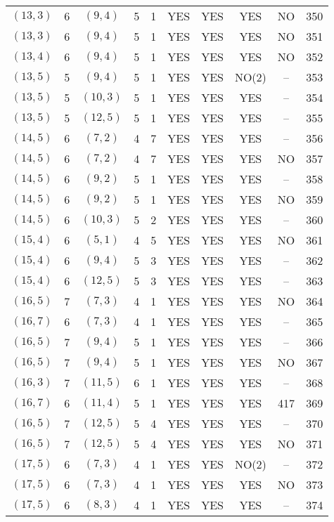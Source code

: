 \begin{longtable}{|c|c|c|c|c|c|c|c|c|c|}
$(13, 3)$ & 6 & $(9, 4)$ & 5 & 1 & YES & YES & YES & NO & 350\\
$(13, 3)$ & 6 & $(9, 4)$ & 5 & 1 & YES & YES & YES & NO & 351\\
$(13, 4)$ & 6 & $(9, 4)$ & 5 & 1 & YES & YES & YES & NO & 352\\
$(13, 5)$ & 5 & $(9, 4)$ & 5 & 1 & YES & YES & NO(2) & -- & 353\\
$(13, 5)$ & 5 & $(10, 3)$ & 5 & 1 & YES & YES & YES & -- & 354\\
$(13, 5)$ & 5 & $(12, 5)$ & 5 & 1 & YES & YES & YES & -- & 355\\
$(14, 5)$ & 6 & $(7, 2)$ & 4 & 7 & YES & YES & YES & -- & 356\\
$(14, 5)$ & 6 & $(7, 2)$ & 4 & 7 & YES & YES & YES & NO & 357\\
$(14, 5)$ & 6 & $(9, 2)$ & 5 & 1 & YES & YES & YES & -- & 358\\
$(14, 5)$ & 6 & $(9, 2)$ & 5 & 1 & YES & YES & YES & NO & 359\\
$(14, 5)$ & 6 & $(10, 3)$ & 5 & 2 & YES & YES & YES & -- & 360\\
$(15, 4)$ & 6 & $(5, 1)$ & 4 & 5 & YES & YES & YES & NO & 361\\
$(15, 4)$ & 6 & $(9, 4)$ & 5 & 3 & YES & YES & YES & -- & 362\\
$(15, 4)$ & 6 & $(12, 5)$ & 5 & 3 & YES & YES & YES & -- & 363\\
$(16, 5)$ & 7 & $(7, 3)$ & 4 & 1 & YES & YES & YES & NO & 364\\
$(16, 7)$ & 6 & $(7, 3)$ & 4 & 1 & YES & YES & YES & -- & 365\\
$(16, 5)$ & 7 & $(9, 4)$ & 5 & 1 & YES & YES & YES & -- & 366\\
$(16, 5)$ & 7 & $(9, 4)$ & 5 & 1 & YES & YES & YES & NO & 367\\
$(16, 3)$ & 7 & $(11, 5)$ & 6 & 1 & YES & YES & YES & -- & 368\\
$(16, 7)$ & 6 & $(11, 4)$ & 5 & 1 & YES & YES & YES & 417 & 369\\
$(16, 5)$ & 7 & $(12, 5)$ & 5 & 4 & YES & YES & YES & -- & 370\\
$(16, 5)$ & 7 & $(12, 5)$ & 5 & 4 & YES & YES & YES & NO & 371\\
$(17, 5)$ & 6 & $(7, 3)$ & 4 & 1 & YES & YES & NO(2) & -- & 372\\
$(17, 5)$ & 6 & $(7, 3)$ & 4 & 1 & YES & YES & YES & NO & 373\\
$(17, 5)$ & 6 & $(8, 3)$ & 4 & 1 & YES & YES & YES & -- & 374\\

\end{longtable}
